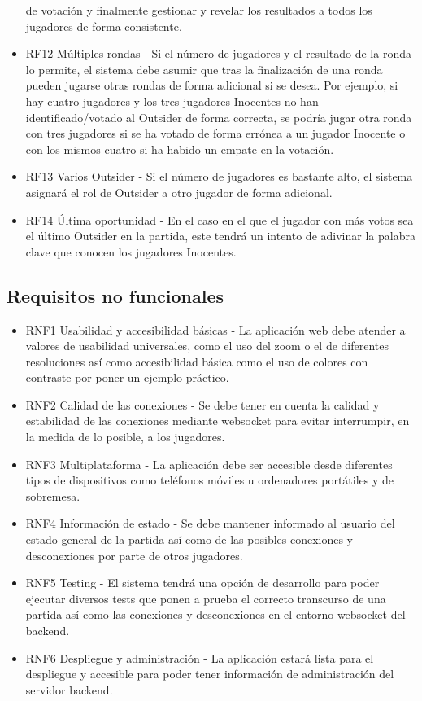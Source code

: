 \begin{itemize}
	      de votación y finalmente gestionar y revelar los resultados a todos los jugadores de forma consistente.
	\item RF12 Múltiples rondas - Si el número de jugadores  y el resultado de la ronda lo permite, el sistema debe asumir que tras
	      la finalización de una ronda pueden jugarse otras rondas de forma adicional si se desea. Por ejemplo, si hay cuatro jugadores y los tres jugadores
	      Inocentes no han identificado/votado al Outsider de forma correcta, se podría jugar otra ronda con tres jugadores si se ha votado de forma
	      errónea a un jugador Inocente o con los mismos cuatro si ha habido un empate en la votación.
	\item RF13 Varios Outsider - Si el número de jugadores es bastante alto, el sistema asignará el rol de Outsider a otro jugador de forma adicional.
	\item RF14 Última oportunidad - En el caso en el que el jugador con más votos sea el último Outsider en la partida, este tendrá un intento de
	      adivinar la palabra clave que conocen los jugadores Inocentes.
\end{itemize}

\subsection{Requisitos no funcionales}

\begin{itemize}
	\item RNF1 Usabilidad y accesibilidad básicas - La aplicación web debe atender a valores de usabilidad universales, como el uso del zoom o
	      el de diferentes resoluciones así como accesibilidad básica como el uso de colores con contraste por poner un ejemplo práctico.
	\item RNF2 Calidad de las conexiones - Se debe tener en cuenta la calidad y estabilidad de las conexiones mediante websocket para evitar
	      interrumpir, en la medida de lo posible, a los jugadores.
	\item RNF3 Multiplataforma - La aplicación debe ser accesible desde diferentes tipos de dispositivos como teléfonos móviles u ordenadores portátiles
	      y de sobremesa.
	\item RNF4 Información de estado - Se debe mantener informado al usuario del estado general de la partida así como de las posibles conexiones y desconexiones
	      por parte de otros jugadores.
	\item RNF5 Testing - El sistema tendrá una opción de desarrollo para poder ejecutar diversos tests que ponen
	      a prueba el correcto transcurso de una partida así como las conexiones y desconexiones en el entorno websocket del backend.
	\item RNF6 Despliegue y administración - La aplicación estará lista para el despliegue y accesible para poder tener información de administración del servidor
	      backend.
\end{itemize}

